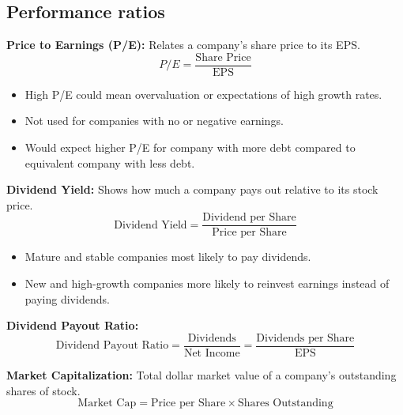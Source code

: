 \subsection{Performance ratios}
\begin{definition}

    \textbf{Price to Earnings (P/E):} Relates a company's share price to its EPS.
    \begin{equation}
        P/E = \frac{\text{Share Price}}{\text{EPS}}
    \end{equation}
    \begin{itemize}
        \item High P/E could mean overvaluation or expectations of high growth rates.
        \item Not used for companies with no or negative earnings.
        \item Would expect higher P/E for company with more debt compared to equivalent company with less debt.
    \end{itemize}
    \vspace{1em}
    
    \textbf{Dividend Yield:} Shows how much a company pays out relative to its stock price.
    \begin{equation}
        \text{Dividend Yield} = \frac{\text{Dividend per Share}}{\text{Price per Share}}
    \end{equation}
    \begin{itemize}
        \item Mature and stable companies most likely to pay dividends.
        \item New and high-growth companies more likely to reinvest earnings instead of paying dividends.
    \end{itemize}
    \vspace{1em}
    
    \textbf{Dividend Payout Ratio:}
    \begin{equation}
        \text{Dividend Payout Ratio} = \frac{\text{Dividends}}{\text{Net Income}} = \frac{\text{Dividends per Share}}{\text{EPS}}
    \end{equation}
    \vspace{1em}
    
    \textbf{Market Capitalization:} Total dollar market value of a company's outstanding shares of stock.
    \begin{equation}
        \text{Market Cap} = \text{Price per Share} \times \text{Shares Outstanding}
    \end{equation}
\end{definition}